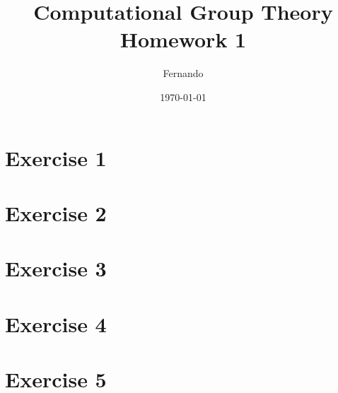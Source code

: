 \documentclass{article}
\begin{document}
\title{Computational Group Theory Homework 1}
\author{Fernando}
\date{\today}
\maketitle

\section*{Exercise 1}
\section*{Exercise 2}
\section*{Exercise 3}
\section*{Exercise 4}
\section*{Exercise 5}
\end{document}
